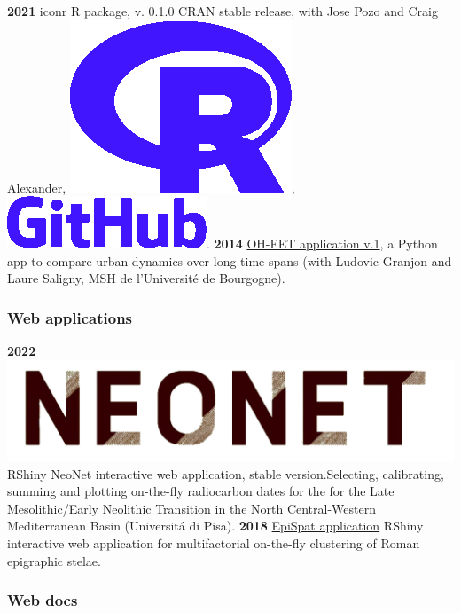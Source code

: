 \documentclass{article}
\begin{document}
\textbf{2021 }iconr \textsf{R} package, v. 0.1.0 CRAN stable release, with Jose Pozo and Craig Alexander, \href{https://cran.r-project.org/web/packages/iconr/index.html}{\includegraphics[scale=0.04]{prog-r.png}}, \href{https://github.com/zoometh/iconr#readme}{\includegraphics[scale=0.1]{github-rect.png}}.
\smallbreak
\textbf{2014 }\href{https://www.oxbowbooks.com/dbbc/caa2014-21st-century-archaeology.html/}{OH-FET application v.1}, a \textsf{Python} app to compare urban dynamics over long time spans (with Ludovic Granjon and Laure Saligny, MSH de l'Universit\'{e} de Bourgogne).

\subsubsection*{Web applications}

\textbf{2022 }\href{http://shinyserver.cfs.unipi.it:3838/C14/}{\includegraphics[scale=0.02]{neonet}} \textsf{RShiny} NeoNet interactive web application, stable version.Selecting, calibrating, summing and plotting on-the-fly radiocarbon dates for the for the Late Mesolithic/Early Neolithic Transition in the North Central-Western Mediterranean Basin (Universit\'{a} di Pisa).
\textbf{2018 }\href{https://epispat.shinyapps.io/analyses_mult_5/}{EpiSpat application} \textsf{RShiny} interactive web application for multifactorial on-the-fly clustering of Roman epigraphic stelae.
\smallbreak

\subsubsection*{Web docs}
\end{document}
